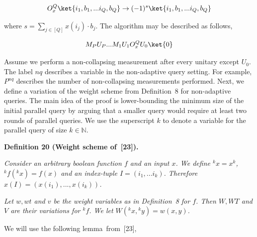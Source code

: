 \documentclass[10pt,a4paper]{article}
\begin{document}
\[\begin{gathered}
\displaystyle O_{x}^{Q}\ket{i_{1},b_{1},...i_{Q},b_{Q}}\rightarrow(-1)^{s}\ket{i_{1},b_{1},...i_{Q},b_{Q}}
\end{gathered}\]




where $s=\sum_{j\in[Q]}x(i_{j})\cdot b_{j}$. The algorithm may be described as follows,\par


\[\begin{gathered}
\displaystyle M_{P}U_{P}...M_{1}U_{1}O_{x}^{Q}U_{0}\ket{0}
\end{gathered}\]




Assume we perform a non-collapsing measurement after every unitary except $U_{0}$. The label $nq$ describes a variable in the non-adaptive query setting. For example, $P^{nq}$ describes the number of non-collapsing measurements performed. Next, we define a variation of the weight scheme from Definition 8 for non-adaptive queries. The main idea of the proof is lower-bounding the minimum size of the initial parallel query by arguing that a smaller query would require at least two rounds of parallel queries. We use the superscript $k$ to denote a variable for the parallel query of size $k\in\mathbb{N}$.\par





\par\medskip\noindent\textbf{
\textbf{Definition 20}\textbf{ }(Weight scheme of [23])\textbf{.}
}\par



\emph{Consider an arbitrary boolean function $f$ and an input $x$. We define ${}^{k}x=x^{k}$, ${}^{k}f({}^{k}x)=f(x)$ and an index-tuple $I=(i_{1},...i_{k})$. Therefore $x(I)=(x(i_{1}),...,x(i_{k}))$.}\par




\emph{Let $w,wt$ and $v$ be the weight variables as in Definition 8 for $f$. Then $W,WT$ and $V$ are their variations for ${}^{k}f$. We let $W({}^{k}x,{}^{k}y)=w(x,y)$.}\par






We will use the following lemma from [23],\par
\end{document}
